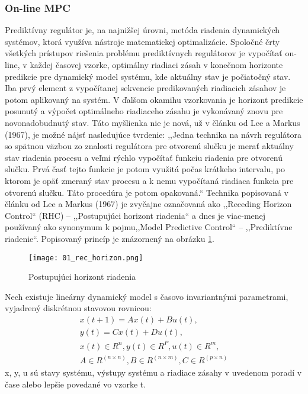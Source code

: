 \subsubsection{On-line MPC}
Prediktívny regulátor je, na najnižšej úrovni, metóda riadenia dynamických systémov, ktorá využíva nástroje matematickej optimalizácie. Spoločné črty všetkých prístupov riešenia problému prediktívnych regulátorov je vypočítať on-line, v každej časovej vzorke,  optimálny riadiaci zásah v konečnom horizonte predikcie pre dynamický model systému, kde aktuálny stav je počiatočný stav. Iba prvý element z vypočítanej sekvencie predikovaných riadiacich zásahov je potom aplikovaný na systém. V ďalšom okamihu vzorkovania je horizont predikcie posunutý a výpočet optimálneho riadiaceho zásahu je vykonávaný znovu pre novonadobudnutý stav. Táto myšlienka nie je nová, už v článku od Lee a Markus (1967), je možné nájsť nasledujúce tvrdenie: ,,Jedna technika na návrh regulátora so spätnou väzbou zo znalosti regulátora pre otvorenú slučku je merať aktuálny stav riadenia procesu a veľmi rýchlo vypočítať funkciu riadenia pre otvorenú slučku. Prvá časť tejto funkcie je potom využitá počas krátkeho intervalu, po ktorom je opäť zmeraný stav procesu a k nemu vypočítaná riadiaca funkcia pre otvorenú slučku. Táto procedúra je potom opakovaná.`` Technika popisovaná v článku od Lee a Markus (1967) je zvyčajne označovaná ako ,,Receding Horizon Control`` (RHC) – ,,Postupujúci horizont riadenia`` a dnes je viac-menej používaný ako synonymum k pojmu,,Model Predictive Control`` – ,,Prediktívne riadenie``. \cite{MPC03} Popisovaný princíp je znázornený na obrázku \ref{01_rec_horizon}.
\begin{figure}[h]
\centering
\texttt{[image: 01\_rec\_horizon.png]}
\caption{Postupujúci horizont riadenia}
\label{01_rec_horizon}
\end{figure}
Nech existuje lineárny dynamický model s časovo invariantnými parametrami, vyjadrený diskrétnou stavovou rovnicou:
\begin{equation} \label{eq1}
\begin{split}
x(t+1)=Ax(t)+Bu(t), \\
y(t)=Cx(t)+Du(t), \\
x(t)∈R^n, y(t)∈R^P, u(t)∈R^m, \\
A∈R^{(n×n)}, B∈R^{(n×m)}, C∈R^{(p×n)}
\end{split}
\end{equation}
x, y, u sú stavy systému, výstupy systému a riadiace zásahy v uvedenom poradí v čase alebo lepšie povedané vo vzorke t. \\
